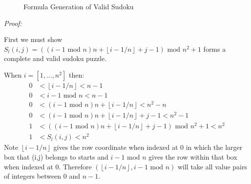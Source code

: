 \documentclass[a4paper,11pt]{report}
\newcounter{row}
\newcounter{col}
\newcounter{rowa}
\newcounter{cola}
\newcommand\setrow[9]{
  \setcounter{col}{1}
  \foreach \n in {#1, #2, #3, #4, #5, #6, #7, #8, #9} {
    \edef\x{\value{col} - 0.5}
    \edef\y{9.5 - \value{row}}
    \node[anchor=center] at (\x, \y) {\n};
    \stepcounter{col}
  }
  \stepcounter{row}
}
\newcommand\setrowa[4]{
  \setcounter{cola}{1}
  \foreach \n in {#1, #2, #3, #4} {
    \edef\x{\value{cola} - 0.5}
    \edef\y{4.5 - \value{rowa}}
    \node[anchor=center] at (\x, \y) {\n};
    \stepcounter{cola}
  }
  \stepcounter{rowa}
}
\begin{document}
\begin{figure}[h]
\centering
{}
\caption{Formula Generation of Valid Sudoku}
\label{formula}
\end{figure}

\textit{Proof:}

First we must show $S_l(i,j)=((i-1 \text{ mod } n)n + \left\lfloor{i-1/n}\right\rfloor+j-1)\text{ mod } n^2 +1$ forms a complete and valid sudoku puzzle.

When $i=[1,...,n^2]$ then:
\begin{align}
	0&<\left\lfloor{i-1/n}\right\rfloor<n-1\\
	0&<i-1 \text{ mod } n<n-1\\
	0&<(i-1 \text{ mod } n)n + \left\lfloor{i-1/n}\right\rfloor<n^2-n\\
	0&<(i-1 \text{ mod } n)n + \left\lfloor{i-1/n}\right\rfloor+j-1<n^2-1\\
	1&<((i-1 \text{ mod } n)n + \left\lfloor{i-1/n}\right\rfloor+j-1)\text{ mod } n^2 +1<n^2\\
	1&<S_l(i,j)<n^2
\end{align} 
Note $\left\lfloor{i-1/n}\right\rfloor$ gives the row coordinate when indexed at 0 in which the larger box that (i,j) belongs to starts and $i-1 \text{ mod } n$ gives the row within that box when indexed at 0. Therefore $(\left\lfloor{i-1/n}\right\rfloor,i-1 \text{ mod } n)$ will take all value pairs of integers between 0 and $n-1$.
\end{document}
